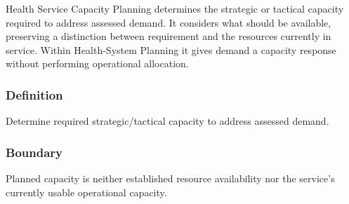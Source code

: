 Health Service Capacity Planning determines the strategic or tactical capacity required to address assessed demand. It considers what should be available, preserving a distinction between requirement and the resources currently in service. Within Health-System Planning it gives demand a capacity response without performing operational allocation.

\subsubsection*{Definition}

Determine required strategic/\allowbreak{}tactical capacity to address assessed demand.

\subsubsection*{Boundary}

Planned capacity is neither established resource availability nor the service's currently usable operational capacity.

